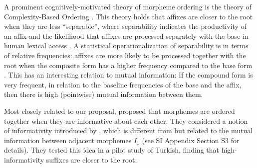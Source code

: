 \documentclass[11pt,letterpaper]{article}
\newcommand{\citep}{\parencite}
\newcommand{\citet}{\Textcite}
\newcounter{def}
\begin{document}
A prominent cognitively-motivated theory of morpheme ordering is the theory of Complexity-Based Ordering \citep{hay2002speech,plag2002the,hay2004what,hay2005shifting,plag2009suffix}.
This theory holds that affixes are closer to the root when they are less ``separable'', where separability indicates the productivity of an affix and the likelihood that affixes are processed separately with the base in human lexical access  \citep{baayen1993on}.
A statistical operationalization of separability is in terms of relative frequencies:
affixes are more likely to be processed together with the root when the composite form has a higher frequency compared to the base form \citep{hay2001lexical}. %
This has an interesting relation to mutual information: 
If the compound form is very frequent, in relation to the baseline frequencies of the base and the affix, then there is high (pointwise) mutual information between them.

Most closely related to our proposal, \citet{inkelas2016affix} proposed that morphemes are ordered together when they are informative about each other.
They considered a notion of informativity introduced by \citet{priva2017informativity}, which is different from but related to the mutual information between adjacent morphemes $I_1$ (see SI Appendix Section S3 for details).
They tested this idea in a pilot study of Turkish, finding that high-informativity suffixes are closer to the root.
\end{document}
